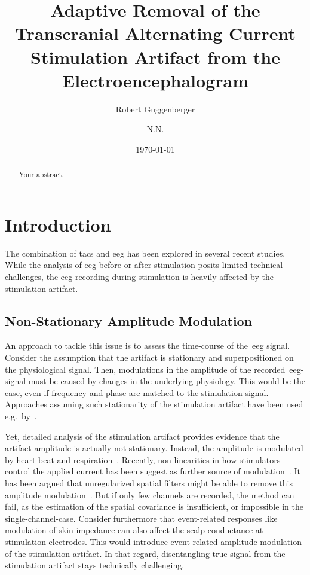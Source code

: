 \documentclass[a4paper]{article}
\title{Adaptive Removal of the Transcranial Alternating Current Stimulation Artifact from the Electroencephalogram}
\author[1,*]{Robert Guggenberger}
\author[1]{N.N.}
\affil[1]{Department for Translational Neurosurgery, University Hospital Tübingen}
\affil[*]{Corresponding author: \email{robert.guggenberger@posteo.eu}}
\date{\today}
\begin{document}
\maketitle
\thispagestyle{fancy}

\begin{abstract}
Your abstract.
\end{abstract}

\section{Introduction}

The combination of \gls{tacs} and \gls{eeg} has been explored in several recent studies. While the analysis of \gls{eeg} before or after stimulation posits limited technical challenges, the \gls{eeg} recording during stimulation is heavily affected by the stimulation artifact.

\subsection{Non-Stationary Amplitude Modulation}

An approach to tackle this issue is to assess the time-course of the~\gls{eeg} signal. Consider the assumption that the artifact is stationary and superpositioned on the physiological signal.
Then, modulations in the amplitude of the recorded~\gls{eeg}-signal must be caused by changes in the underlying physiology.
This would be the case, even if frequency and phase are matched to the stimulation signal. Approaches assuming such stationarity of the stimulation artifact have been used e.g.\ by~\cite{Pogosyan_2009}.

Yet, detailed analysis of the stimulation artifact provides evidence that the artifact amplitude is actually not stationary. Instead, the amplitude is modulated by heart-beat and respiration~\citep{Noury_2016}.
Recently, non-linearities in how stimulators control the applied current has been suggest as further source of modulation~\citep{Neuling_2017}.
It has been argued that unregularized spatial filters might be able to remove this amplitude modulation~\citep{Neuling_2017}. But if only few channels are recorded, the method can fail, as the estimation of the spatial covariance is insufficient, or impossible in the single-channel-case.
Consider furthermore that event-related responses like modulation of skin impedance can also affect the scalp conductance at stimulation electrodes. This would introduce event-related amplitude modulation of the stimulation artifact. In that regard, disentangling true signal from the stimulation artifact stays technically challenging.
\end{document}
